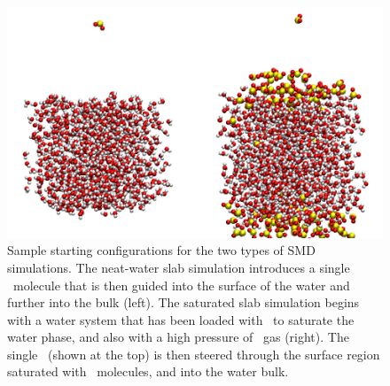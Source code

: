 \begin{figure}[h!]
	\begin{center}
		\includegraphics[scale=1.0]{images/startingconfigurations.png}
		\caption{Sample starting configurations for the two types of SMD simulations. The neat-water slab simulation introduces a single \suldiox~molecule that is then guided into the surface of the water and further into the bulk (left). The saturated slab simulation begins with a water system that has been loaded with \suldiox~to saturate the water phase, and also with a high pressure of \suldiox~gas (right). The single \suldiox~(shown at the top) is then steered through the surface region saturated with \suldiox~molecules, and into the water bulk.}
		\label{fig:starting-configurations}
	\end{center}
\end{figure}
